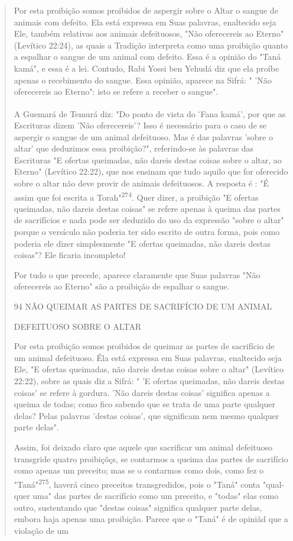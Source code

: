 \begin{quote}
Por esta proibição somos proibidos de aspergir sobre o Altar o san­gue
de animais com defeito. Ela está expressa em Suas palavras, enaltecido
seja Ele, também relativas aos animais defeituosos, "Não oferecereis ao
Eterno" (Le­vítico 22:24), as quais a Tradição interpreta como uma
proibição quanto a es­palhar o sangue de um animal com defeito. Essa é a
opinião do "Taná kamá", e essa é a lei. Contudo, Rabi Yossi ben Yehudá
diz que ela proíbe apenas o re­cebimento do sangue. Essa opinião,
aparece na Sifrá: " 'Não oferecereis ao Eter­no": isto se refere a
receber o sangue".

A Guemará de Temurá diz: "Do ponto de vista do \textsuperscript{-}Fana
kamá', por que as Escrituras dizem 'Não oferecereis'? Isso é necessário
para o caso de se aspergir o sangue de um animal defeituoso. Mas é das
palavras 'sobre o altar' que deduzimos essa proibição?", referindo-se às
palavras das Escrituras "E ofertas queimadas, não dareis destas coisas
sobre o altar, ao Eterno" (Levítico 22:22), que nos ensinam que tudo
aquilo que for oferecido sobre o altar não deve pro­vir de animais
defeituosos. A resposta é : "É assim que foi escrita a
Torah"\textsuperscript{274}. Quer dizer, a proibição "E ofertas
queimadas, não dareis destas coisas" se refe­re apenas à queima das
partes de sacrifícios e nada pode ser deduzido do uso da expressão
"sobre o altar" porque o versículo não poderia ter sido escrito de outra
forma, pois como poderia ele dizer simplesmente "E ofertas queima­das,
não dareis destas coisas"? Ele ficaria incompleto!

Por tudo o que precede, aparece claramente que Suas palavras "Não
oferecereis ao Eterno" são a proibição de espalhar o sangue.

94 NÃO QUEIMAR AS PARTES DE SACRIFÍCIO DE UM ANIMAL

DEFEITUOSO SOBRE O ALTAR

Por esta proibição somos proibidos de queimar as partes de sacrifí­cio
de um animal defeituoso. Éla está expressa em Suas palavras, enaltecido
se­ja Ele, "E ofertas queimadas, não dareis destas coisas sobre o altar"
(Levítico 22:22), sobre as quais diz a Sifrá: " 'E ofertas queimadas,
não dareis destas coi­sas' se refere à gordura. 'Não dareis destas
coisas' significa apenas a queima de todas; como fico sabendo que se
trata de uma parte qualquer delas? Pelas pala­vras 'destas coisas', que
significam nem mesmo qualquer parte delas".

Assim, foi deixado claro que aquele que sacrificar um animal defei­tuoso
transgride quatro proibiçõçs, se contarmos a queima das partes de
sacri­fício como apenas um preceito; mas se o contarmos como dois, como
fez o "Taná"\textsuperscript{275}, haverá cinco preceitos transgredidos,
pois o "Taná" conta "qual­quer uma" das partes de sacrifício como um
preceito, e "todas" elas como ou­tro, sustentando que "destas coisas"
significa qualquer parte delas, embora ha­ja apenas uma proibição.
Parece que o "Taná" é de opiniãd que a violação de um
\end{quote}

